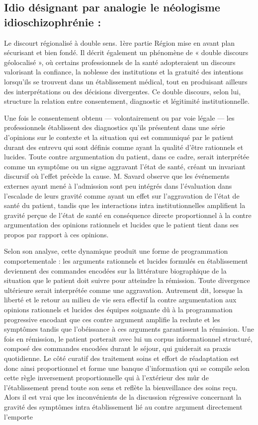 \documentclass[12pt,a4paper]{article}
\begin{document}
\subsection*{Idio désignant par analogie le néologisme idioschizophrénie :}
Le discourt régionalisé à double sens. 1ère partie Région mise en avant plan sécurisant et bien fondé.
Il décrit également un phénomène de « double discours géolocalisé », où certains professionnels de la santé adopteraient un discours valorisant la confiance, la noblesse des institutions et la gratuité des intentions lorsqu’ils se trouvent dans un établissement médical, tout en produisant ailleurs des interprétations ou des décisions divergentes. Ce double discours, selon lui, structure la relation entre consentement, diagnostic et légitimité institutionnelle.

Une fois le consentement obtenu — volontairement ou par voie légale — les professionnels établissent des diagnostics qu’ils présentent dans une série d’opinions sur le contexte et la situation qui est communiqué par le patient durant des entrevu qui sont définis comme ayant la qualité d’être rationnels et lucides. Toute contre argumentation du patient, dans ce cadre, serait interprétée comme un symptôme ou un signe aggravant l’état de santé, créant un invariant discursif où l’effet précède la cause. M. Savard observe que les événements externes ayant mené à l’admission sont peu intégrés dans l’évaluation dans l’escalade de leurs gravité comme ayant un effet sur l’aggravation de l’état de santé du patient, tandis que les interactions intra institutionnelles amplifient la gravité perçue de l’état de santé en conséquence directe proportionnel à la contre argumentation des opinions rationnels et lucides que le patient tient dans ses propos par rapport à ces opinions.

Selon son analyse, cette dynamique produit une forme de programmation comportementale : les arguments rationnels et lucides formulés en établissement deviennent des commandes encodées sur la littérature biographique de la situation que le patient doit suivre pour atteindre la rémission. Toute divergence ultérieure serait interprétée comme une aggravation. Autrement dit, lorsque la liberté et le retour au milieu de vie sera effectif la contre argumentation aux opinions rationnels et lucides des équipes soignante dû à la programmation progressive encodant que ces contre argument amplifie la rechute et les symptômes tandis que l’obéissance à ces arguments garantissent la rémission. Une fois en rémission, le patient porterait avec lui un corpus informationnel structuré, composé des commandes encodées durant le séjour, qui guiderait sa praxis quotidienne. Le côté curatif des traitement soins et effort de réadaptation est donc ainsi proportionnel et forme une banque d’information qui se compile selon cette règle inversement proportionnelle qui à l’extérieur des mûr de l’établissement prend toute son sens et reflète la bienveillance des soins reçu. Alors il est vrai que les inconvénients de la discussion régressive concernant la gravité des symptômes intra établissement lié au contre argument directement l’emporte
\end{document}

